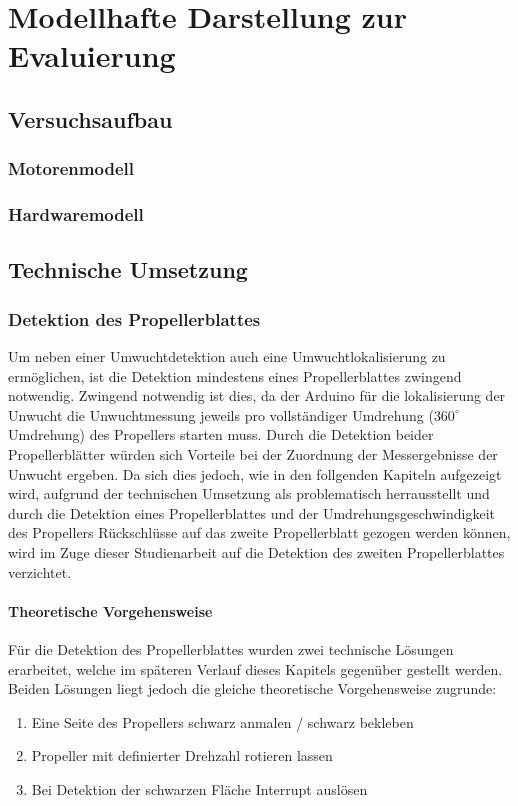 
\chapter{Modellhafte Darstellung zur Evaluierung}

\section{Versuchsaufbau}

\subsection{Motorenmodell}

\subsection{Hardwaremodell}

\section{Technische Umsetzung}

\subsection{Detektion des Propellerblattes}
Um neben einer Umwuchtdetektion auch eine Umwuchtlokalisierung zu ermöglichen, ist die Detektion mindestens eines Propellerblattes zwingend notwendig.
Zwingend notwendig ist dies, da der Arduino für die lokalisierung der Unwucht die Unwuchtmessung jeweils pro vollständiger Umdrehung ($360^\circ$ Umdrehung) des Propellers starten muss.
Durch die Detektion beider Propellerblätter würden sich Vorteile bei der Zuordnung der Messergebnisse der Unwucht ergeben. 
Da sich dies jedoch, wie in den follgenden Kapiteln aufgezeigt wird, aufgrund der technischen Umsetzung als problematisch herrausstellt und durch die Detektion eines Propellerblattes und der Umdrehungsgeschwindigkeit des Propellers Rückschlüsse auf das zweite Propellerblatt gezogen werden können, wird im Zuge dieser Studienarbeit auf die Detektion des zweiten Propellerblattes verzichtet.

\subsubsection*{Theoretische Vorgehensweise}
Für die Detektion des Propellerblattes wurden zwei technische Lösungen erarbeitet, welche im späteren Verlauf dieses Kapitels gegenüber gestellt werden.
Beiden Lösungen liegt jedoch die gleiche theoretische Vorgehensweise zugrunde:
\begin{enumerate}
	\item Eine Seite des Propellers schwarz anmalen / schwarz bekleben
	\item Propeller mit definierter Drehzahl rotieren lassen
	\item Bei Detektion der schwarzen Fläche Interrupt auslösen
\end{enumerate}


